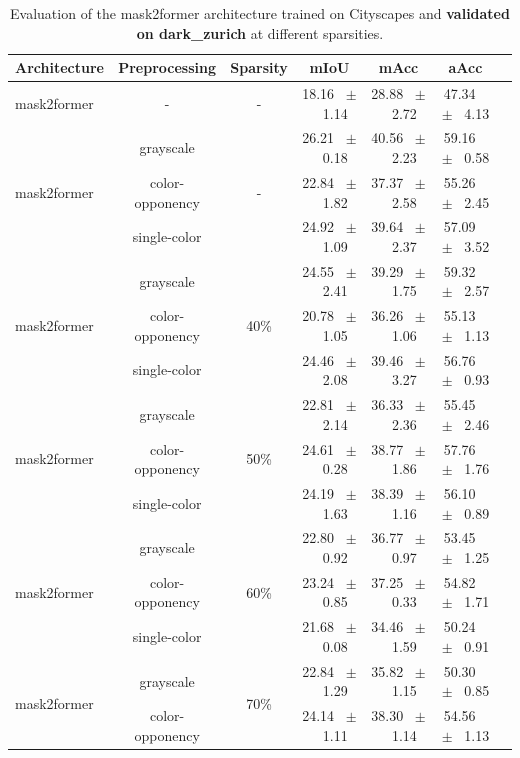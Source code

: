 \begin{table}[h]
  \centering
  \caption{Evaluation of the mask2former architecture trained on Cityscapes and \textbf{validated on dark_zurich} at different sparsities.}
  \begin{tabular}{@{}lccc ccc@{}}
    \toprule
    Architecture & Preprocessing & Sparsity & mIoU & mAcc & aAcc \\
    \midrule
    mask2former & - & - & 18.16 ~$\pm$~ 1.14 & 28.88 ~$\pm$~ 2.72 & 47.34 ~$\pm$~ 4.13 \\
    \midrule
    \midrule
    \multirow{3}{*}{mask2former} & grayscale & \multirow{3}{*}{-} & 26.21 ~$\pm$~ 0.18 & 40.56 ~$\pm$~ 2.23 & 59.16 ~$\pm$~ 0.58 \\
    & color-opponency & & 22.84 ~$\pm$~ 1.82 & 37.37 ~$\pm$~ 2.58 & 55.26 ~$\pm$~ 2.45 \\
    & single-color & & 24.92 ~$\pm$~ 1.09 & 39.64 ~$\pm$~ 2.37 & 57.09 ~$\pm$~ 3.52 \\
    \midrule
    \multirow{3}{*}{mask2former} & grayscale & \multirow{3}{*}{40\%} & 24.55 ~$\pm$~ 2.41 & 39.29 ~$\pm$~ 1.75 & 59.32 ~$\pm$~ 2.57 \\
    & color-opponency & & 20.78 ~$\pm$~ 1.05 & 36.26 ~$\pm$~ 1.06 & 55.13 ~$\pm$~ 1.13 \\
    & single-color & & 24.46 ~$\pm$~ 2.08 & 39.46 ~$\pm$~ 3.27 & 56.76 ~$\pm$~ 0.93 \\
    \midrule
    \multirow{3}{*}{mask2former} & grayscale & \multirow{3}{*}{50\%} & 22.81 ~$\pm$~ 2.14 & 36.33 ~$\pm$~ 2.36 & 55.45 ~$\pm$~ 2.46 \\
    & color-opponency & & 24.61 ~$\pm$~ 0.28 & 38.77 ~$\pm$~ 1.86 & 57.76 ~$\pm$~ 1.76 \\
    & single-color & & 24.19 ~$\pm$~ 1.63 & 38.39 ~$\pm$~ 1.16 & 56.10 ~$\pm$~ 0.89 \\
    \midrule
    \multirow{3}{*}{mask2former} & grayscale & \multirow{3}{*}{60\%} & 22.80 ~$\pm$~ 0.92 & 36.77 ~$\pm$~ 0.97 & 53.45 ~$\pm$~ 1.25 \\
    & color-opponency & & 23.24 ~$\pm$~ 0.85 & 37.25 ~$\pm$~ 0.33 & 54.82 ~$\pm$~ 1.71 \\
    & single-color & & 21.68 ~$\pm$~ 0.08 & 34.46 ~$\pm$~ 1.59 & 50.24 ~$\pm$~ 0.91 \\
    \midrule
    \multirow{3}{*}{mask2former} & grayscale & \multirow{3}{*}{70\%} & 22.84 ~$\pm$~ 1.29 & 35.82 ~$\pm$~ 1.15 & 50.30 ~$\pm$~ 0.85 \\
    & color-opponency & & 24.14 ~$\pm$~ 1.11 & 38.30 ~$\pm$~ 1.14 & 54.56 ~$\pm$~ 1.13 \\

\end{tabular}
\end{table}
